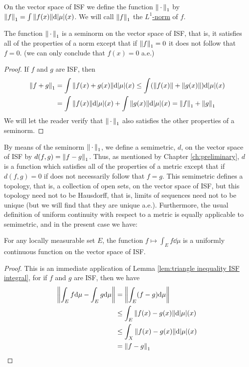 \begin{definition}
On the vector space of ISF we define the function $\norm{\,\cdot\,}_1$ by $\norm{f}_1=\int\norm{f(x)}\dd|\mu|(x)$. We will call $\norm{f}_1$ the \underline{$L^1$-norm} of $f$.
\end{definition}

\begin{lemma}
\label{lem:L1 seminorm on ISF}
The function $\norm{\,\cdot\,}_1$ is a seminorm on the vector space of ISF, that is, it satisfies all of the properties of a norm except that if $\norm{f}_1=0$ it does not follow that $f=0$. (we can only conclude that $f(x)=0$ a.e.)
\end{lemma}
\begin{proof}
If $f$ and $g$ are ISF, then
\begin{align*}
    \norm{f+g}_1&=\int\norm{f(x)+g(x)}\dd|\mu|(x)\leq\int(\norm{f(x)}+\norm{g(x)})\dd|\mu|(x)\\
    &=\int\norm{f(x)}\dd|\mu|(x)+\int\norm{g(x)}\dd|\mu|(x)=\norm{f}_1+\norm{g}_1
\end{align*}
We will let the reader verify that $\norm{\,\cdot\,}_1$ also satisfies the other properties of a seminorm.
\end{proof}

By means of the seminorm $\norm{\,\cdot\,}_1$, we define a semimetric, $d$, on the vector space of ISF by $d(f,g)=\norm{f-g}_1$. Thus, as mentioned by Chapter \ref{ch:preliminary}, $d$ is a function which satisfies all of the properties of a metric except that if $d(f,g)=0$ if does not necessarily follow that $f=g$. This semimetric defines a topology, that is, a collection of open sets, on the vector space of ISF, but this topology need not to be Hausdorff, that is, limits of sequences need not to be unique (but we will find that they are unique a.e.). Furthermore, the usual definition of uniform continuity with respect to a metric is equally applicable to semimetric, and in the present case we have:

\begin{lemma}
\label{lem:integral on E uniform cts on ISF}
For any locally measurable set $E$, the function $f\mapsto\int_Ef\dd\mu$ is a uniformly continuous function on the vector space of ISF.
\end{lemma}

\begin{proof}
This is an immediate application of Lemma \ref{lem:triangle inequality ISF integral}, for if $f$ and $g$ are ISF, then we have
\begin{align*}
    \norm{\int_Ef\dd\mu-\int_Eg\dd\mu}&=\norm{\int_E(f-g)\dd\mu}\\
    &\leq\int_E\norm{f(x)-g(x)}\dd|\mu|(x)\\
    &\leq\int_X\norm{f(x)-g(x)}\dd|\mu|(x)\\
    &=\norm{f-g}_1
\end{align*}
\end{proof}

